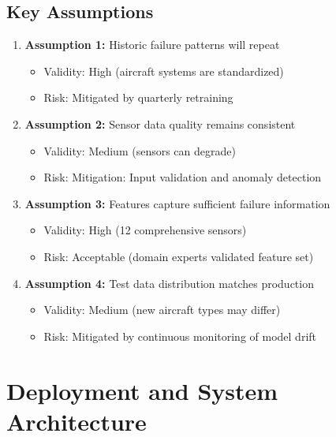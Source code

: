 \documentclass[11pt,a4paper]{article}
\begin{document}
\subsection{Key Assumptions}

\begin{enumerate}
    \item \textbf{Assumption 1:} Historic failure patterns will repeat
    \begin{itemize}
        \item Validity: High (aircraft systems are standardized)
        \item Risk: Mitigated by quarterly retraining
    \end{itemize}
    
    \item \textbf{Assumption 2:} Sensor data quality remains consistent
    \begin{itemize}
        \item Validity: Medium (sensors can degrade)
        \item Risk: Mitigation: Input validation and anomaly detection
    \end{itemize}
    
    \item \textbf{Assumption 3:} Features capture sufficient failure information
    \begin{itemize}
        \item Validity: High (12 comprehensive sensors)
        \item Risk: Acceptable (domain experts validated feature set)
    \end{itemize}
    
    \item \textbf{Assumption 4:} Test data distribution matches production
    \begin{itemize}
        \item Validity: Medium (new aircraft types may differ)
        \item Risk: Mitigated by continuous monitoring of model drift
    \end{itemize}
\end{enumerate}

\section{Deployment and System Architecture}
\end{document}
